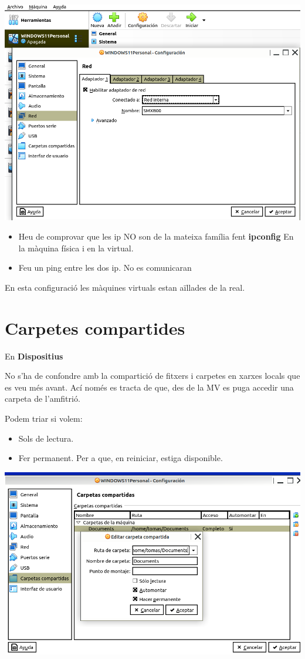 \documentclass[
  12 pt,
  a4paper,
]{article}
\providecommand{\tightlist}{%
  \setlength{\itemsep}{0pt}\setlength{\parskip}{0pt}}
\begin{document}
\includegraphics{png/xarxainterna.png}

\begin{itemize}
\tightlist
\item
  Heu de comprovar que les ip NO son de la mateixa família fent
  \textbf{ipconfig} En la màquina física i en la virtual.
\item
  Feu un ping entre les dos ip. No es comunicaran
\end{itemize}

En esta configuració les màquines virtuals estan aïllades de la real.

\newpage

\section{Carpetes compartides}\label{carpetes-compartides}

En \textbf{Dispositius}

No s'ha de confondre amb la compartició de fitxers i carpetes en xarxes
locals que es veu més avant. Ací només es tracta de que, des de la MV es
puga accedir una carpeta de l'amfitrió.

Podem triar si volem:

\begin{itemize}
\item
  Sols de lectura.
\item
  Fer permanent. Per a que, en reiniciar, estiga disponible.
\end{itemize}

\includegraphics{png/carpetacompartida.png}
\end{document}
